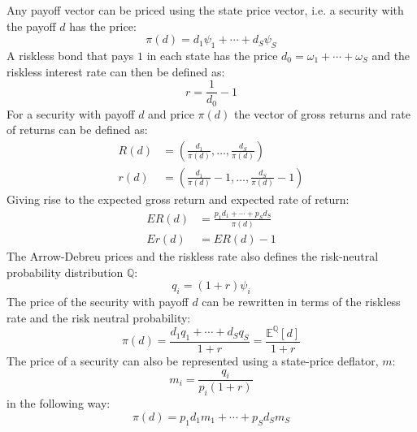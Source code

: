 \documentclass[10pt,a4paper]{article}
\begin{document}
        Any payoff vector can be priced using the state price vector, i.e. a security with the payoff $d$ has the price:
            \begin{equation}
                \pi(d) = d_{1}\psi_{1} + \cdots + d_{S}\psi_{S}
            \end{equation}
        A riskless bond that pays $1$ in each state has the price $d_{0} = \omega_{1} + \cdots + \omega_{S}$ and the riskless interest rate can then be defined as:
            \begin{equation}
                r = \frac{1}{d_{0}} - 1
            \end{equation}
        For a security with payoff $d$ and price $\pi(d)$ the vector of gross returns and rate of returns can be defined as:
            \begin{align}
                R(d) &= \left(\frac{d_{1}}{\pi(d)}, \dots, \frac{d_{S}}{\pi(d)} \right) \\
                r(d) &= \left(\frac{d_{1}}{\pi(d)} - 1, \dots, \frac{d_{S}}{\pi(d)} - 1\right)
            \end{align}
        Giving rise to the expected gross return and expected rate of return:
            \begin{align}
                ER(d) &= \frac{p_{1}d_{1} + \cdots + p_{S}d_{S}}{\pi(d)} \\
                Er(d) &= ER(d) - 1
            \end{align}
        The Arrow-Debreu prices and the riskless rate also defines the risk-neutral probability distribution $\mathbb{Q}$:
            \begin{equation}
                q_{i} = (1 + r)\psi_{i}
            \end{equation}
        The price of the security with payoff $d$ can be rewritten in terms of the riskless rate and the risk neutral probability:
            \begin{equation}
                \pi(d) = \frac{d_{1}q_{1} + \cdots + d_{S}q_{S}}{1+r} = \frac{\mathbb{E}^{\mathbb{Q}}\left[d\right]}{1+r} 
            \end{equation}
        The price of a security can also be represented using a state-price deflator, $m$:
            \begin{equation}
                m_{i} = \frac{q_{i}}{p_{i}(1+r)} 
            \end{equation}
        in the following way:
            \begin{equation}
                \pi(d) = p_{1}d_{1}m_{1} + \cdots + p_{S}d_{S}m_{S}
            \end{equation}
\end{document}
